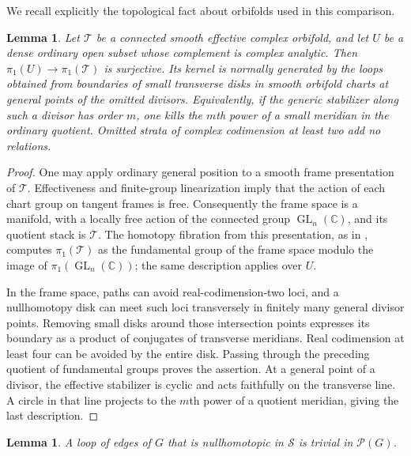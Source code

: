 \documentclass[11pt,reqno]{amsart}
\numberwithin{equation}{section}
\newtheorem{lemma}[theorem]{Lemma}
\theoremstyle{definition}
\theoremstyle{remark}
\newcommand{\C}{\mathbb C}
\newcommand{\cS}{\mathcal S}
\begin{document}
We recall explicitly the topological fact about orbifolds used in
this comparison.

\begin{lemma}\label{app:orbifold-meridians}
Let $\mathcal T$ be a connected smooth effective complex orbifold, and
let $U$ be a dense ordinary open subset whose complement is complex
analytic.  Then $\pi_1(U)\to\pi_1(\mathcal T)$ is surjective.  Its
kernel is normally generated by the loops obtained from boundaries
of small transverse disks in smooth orbifold charts at general
points of the omitted divisors.  Equivalently, if the generic
stabilizer along such a divisor has order $m$, one kills the $m$th
power of a small meridian in the ordinary quotient.  Omitted strata
of complex codimension at least two add no relations.
\end{lemma}

\begin{proof}
One may apply ordinary general position to a smooth frame
presentation of $\mathcal T$.  Effectiveness and finite-group
linearization imply that the action of each chart group on tangent
frames is free.  Consequently the frame space is a manifold, with a
locally free action of the connected group $\operatorname{GL}_n(\C)$,
and its quotient stack is $\mathcal T$.  The homotopy fibration from
this presentation, as in \cite[Example~5.6]{Noohi2014}, computes $\pi_1(\mathcal T)$ as the fundamental
group of the frame space modulo the image of
$\pi_1(\operatorname{GL}_n(\C))$; the same description applies over
$U$.

In the frame space, paths can avoid real-codimension-two loci, and a
nullhomotopy disk can meet such loci transversely in finitely many
general divisor points.  Removing small disks around those
intersection points expresses its boundary as a product of
conjugates of transverse meridians.  Real codimension at least four
can be avoided by the entire disk.  Passing through the preceding
quotient of fundamental groups proves the assertion.  At a general
point of a divisor, the effective stabilizer is cyclic and acts
faithfully on the transverse line.  A circle in that line projects
to the $m$th power of a quotient meridian, giving the last description.
\end{proof}

\begin{lemma}\label{app:true-relations}
A loop of edges of $G$ that is nullhomotopic in $\cS$ is trivial in
$\mathcal P(G)$.
\end{lemma}
\end{document}

